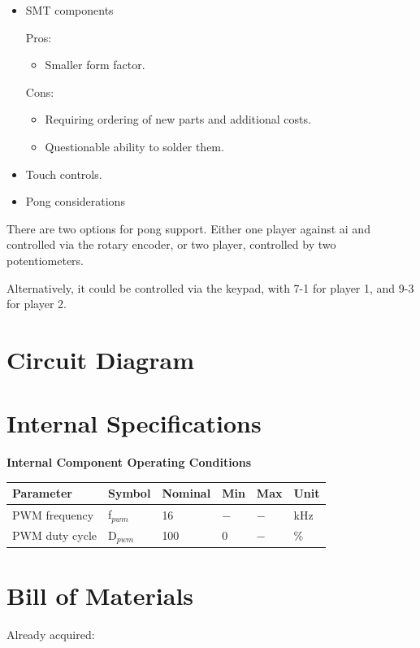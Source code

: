 \documentclass{article}
\begin{document}
\begin{itemize}
	\item SMT components

	Pros:
	\begin{itemize}
		\item Smaller form factor.
	\end{itemize}
	Cons:
	\begin{itemize}
		\item Requiring ordering of new parts and additional costs.
		\item Questionable ability to solder them.
	\end{itemize}

	\item Touch controls.

	\item Pong considerations
\end{itemize}
There are two options for pong support. Either one player against ai and controlled via
the rotary encoder, or two player, controlled by two potentiometers.

Alternatively, it could be controlled via the keypad, with 7-1 for player 1, and 9-3 for player 2.


\section{Circuit Diagram}

\section{Internal Specifications}
\begin{center}
	\textbf{Internal Component Operating Conditions}\\
	\begin{tabular}{ |p{5cm}||p{1.5cm}|p{1.5cm}|p{1cm}|p{1cm}|p{2cm}|}
		\hline
		\textbf{Parameter}&\textbf{Symbol}&\textbf{Nominal}&\textbf{Min}&\textbf{Max}&\textbf{Unit}\\
		\hline\hline
		PWM frequency		& f$_{pwm}$	&	16	&	$-$	&	$-$	&	kHz	\\
		PWM duty cycle		& D$_{pwm}$	&	100	&	0	&	$-$	&	\%	\\
		\hline
	\end{tabular}
\end{center}



\section{Bill of Materials}
Already acquired:
\end{document}

